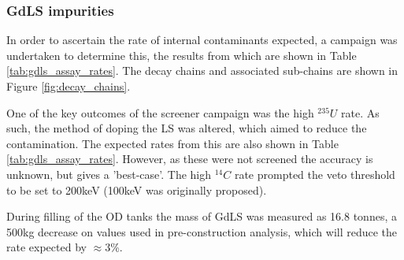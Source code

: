 \subsubsection{GdLS impurities}
\par
In order to ascertain the rate of internal contaminants expected, a campaign was undertaken \cite{scotthaselschwardt_thesis_ref} to determine this, the results from which are shown in Table \ref{tab:gdls_assay_rates}.
The decay chains and associated sub-chains are shown in Figure \ref{fig:decay_chains}.

\par
One of the key outcomes of the screener campaign was the high ${}^{235}U$ rate.
As such, the method of doping the LS was altered, which aimed to reduce the contamination.
The expected rates from this are also shown in Table \ref{tab:gdls_assay_rates}.
However, as these were not screened the accuracy is unknown, but gives a 'best-case'.
The high ${}^{14}{C}$ rate prompted the veto threshold to be set to 200keV (100keV was originally proposed).

\par
During filling of the OD tanks the mass of GdLS was measured as 16.8 tonnes, a 500kg decrease on values used in pre-construction analysis, which will reduce the rate expected by $\approx$3\%.


